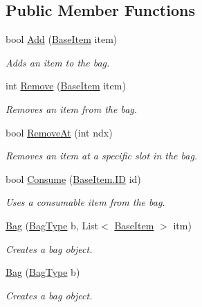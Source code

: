 \subsection*{Public Member Functions}
\begin{DoxyCompactItemize}
\item 
bool \mbox{\hyperlink{class_bag_a4efd17483fce361ea8a01dcda349b3b4}{Add}} (\mbox{\hyperlink{class_base_item}{Base\+Item}} item)
\begin{DoxyCompactList}\small\item\em Adds an item to the bag. \end{DoxyCompactList}\item 
int \mbox{\hyperlink{class_bag_a42a4319aa14d0b6bda7f91070ba57a47}{Remove}} (\mbox{\hyperlink{class_base_item}{Base\+Item}} item)
\begin{DoxyCompactList}\small\item\em Removes an item from the bag. \end{DoxyCompactList}\item 
bool \mbox{\hyperlink{class_bag_a2f11a414bf3edfd7f380f30b71f34104}{Remove\+At}} (int ndx)
\begin{DoxyCompactList}\small\item\em Removes an item at a specific slot in the bag. \end{DoxyCompactList}\item 
bool \mbox{\hyperlink{class_bag_a85aa679243be4a24a6278d5f68c2ed5e}{Consume}} (\mbox{\hyperlink{class_base_item_add9920d2f5a4fa91752714a8f3ab424b}{Base\+Item.\+ID}} id)
\begin{DoxyCompactList}\small\item\em Uses a consumable item from the bag. \end{DoxyCompactList}\item 
\mbox{\hyperlink{class_bag_a3df4934de8cf1a5e5952a77160ee4ca8}{Bag}} (\mbox{\hyperlink{class_bag_a5a827c44705d57202edc93b9a39316c7}{Bag\+Type}} b, List$<$ \mbox{\hyperlink{class_base_item}{Base\+Item}} $>$ itm)
\begin{DoxyCompactList}\small\item\em Creates a bag object. \end{DoxyCompactList}\item 
\mbox{\hyperlink{class_bag_a8d6e5dcefb12fc099b2b02347e5dacae}{Bag}} (\mbox{\hyperlink{class_bag_a5a827c44705d57202edc93b9a39316c7}{Bag\+Type}} b)
\begin{DoxyCompactList}\small\item\em Creates a bag object. \end{DoxyCompactList}\item 

\end{DoxyCompactItemize}
